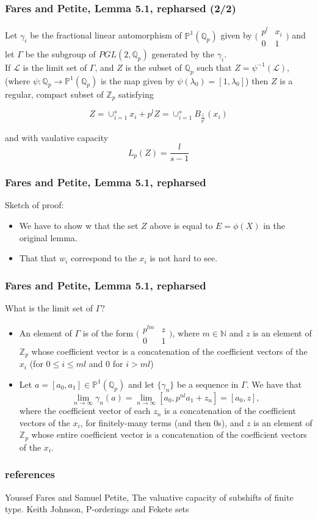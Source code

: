 \documentclass{beamer}
\theoremstyle{definition}
\begin{document}
\begin{frame}
\frametitle{Fares and Petite, Lemma 5.1, repharsed (2/2)}
 Let $\gamma_i$ be the fractional linear automorphism of $\mathbb{P}^{1}(\mathbb{Q}_p)$ given by $\bigl( \begin{smallmatrix}p^l & x_i\\ 0 & 1 \end{smallmatrix}\bigr)$ and let $\Gamma$ be the subgroup of $PGL(2,\mathbb{Q}_p)$ generated by the $\gamma_i$.\\
If $\mathcal{L}$ is the limit set of $\Gamma$, and $Z$ is the subset of $\mathbb{Q}_p$ such that $Z = \psi^{-1}(\mathcal{L})$, (where $\psi: \mathbb{Q}_p \rightarrow \mathbb{P}^1(\mathbb{Q}_p)$ is the map given by $\psi(\lambda_0) = [1, \lambda_0]$) then $Z$ is a regular, compact subset of $\mathbb{Z}_p$ satisfying

$$ Z= \cup_{i=1}^s x_i + p^lZ =\cup_{i=1}^s B_{\frac{1}{p^l}}(x_i)$$

and with vaulative capacity \[L_p(Z) = \frac{l}{s-1}\]

\end{frame}

\begin{frame}
\frametitle{Fares and Petite, Lemma 5.1, repharsed}
Sketch of proof:
\begin{itemize}
\item We have to show w that the set $Z$ above is equal to $E=\phi(X)$ in the original lemma.
\item That that $w_i$ correspond to the $x_i$ is not hard to see.
\end{itemize}
\end{frame}

\begin{frame}
\frametitle{Fares and Petite, Lemma 5.1, repharsed}
What is the limit set of $\Gamma$?
\begin{itemize}
\item An element of $\Gamma$ is of the form $\bigl( \begin{smallmatrix}p^{lm} & z\\ 0 & 1 \end{smallmatrix}\bigr)$, where $m \in \mathbb{N}$ and $z$ is an element of $\mathbb{Z}_p$ whose coefficient vector is a concatenation of the coefficient vectors of the $x_i$ (for $0 \leq i \leq ml$ and $0$ for $i > ml$)
\item  Let $a=[a_0,a_1] \in \mathbb{P}^1(\mathbb{Q}_p)$ and let $\{\gamma_n\}$ be a sequence in $\Gamma$. We have that $$\lim_{n\to\infty} \gamma_n(a) = \lim_{n\to\infty} [a_0, p^{nl}a_1 + z_n] = [a_0, z],$$ where the coefficient vector of each $z_n$ is a concatenation of the coefficient vectors of the $x_i$, for finitely-many terms (and then $0$s), and $z$ is an element of $\mathbb{Z}_p$ whose entire coefficient vector is a concatenation of the coefficient vectors of the $x_i$.

\end{itemize}

\end{frame}


\begin{frame}
\frametitle{references}
\begin{thebibliography}{1}
 Youssef Fares and Samuel Petite, The valuative capacity of subshifts of finite type.
 Keith Johnson, P-orderings and Fekete sets
\end{thebibliography}
\end{frame}
\end{document}

